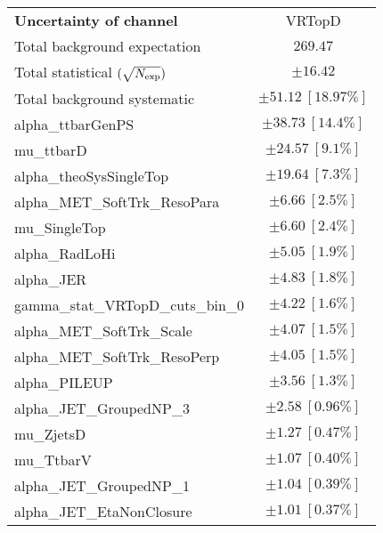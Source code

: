 
\begin{table}
\begin{center}
\setlength{\tabcolsep}{0.0pc}
\begin{tabular*}{\textwidth}{@{\extracolsep{\fill}}lc}
\noalign{\smallskip}\hline\noalign{\smallskip}
{\bf Uncertainty of channel}                                    & VRTopD            \\
\noalign{\smallskip}\hline\noalign{\smallskip}
Total background expectation             &  $269.47$       \\
\noalign{\smallskip}\hline\noalign{\smallskip}
Total statistical $(\sqrt{N_{\rm exp}})$              & $\pm 16.42$       \\
Total background systematic               & $\pm 51.12\ [18.97\%] $             \\
\noalign{\smallskip}\hline\noalign{\smallskip}
\noalign{\smallskip}\hline\noalign{\smallskip}
alpha\_ttbarGenPS         & $\pm 38.73\ [14.4\%] $       \\
mu\_ttbarD         & $\pm 24.57\ [9.1\%] $       \\
alpha\_theoSysSingleTop         & $\pm 19.64\ [7.3\%] $       \\
alpha\_MET\_SoftTrk\_ResoPara         & $\pm 6.66\ [2.5\%] $       \\
mu\_SingleTop         & $\pm 6.60\ [2.4\%] $       \\
alpha\_RadLoHi         & $\pm 5.05\ [1.9\%] $       \\
alpha\_JER         & $\pm 4.83\ [1.8\%] $       \\
gamma\_stat\_VRTopD\_cuts\_bin\_0         & $\pm 4.22\ [1.6\%] $       \\
alpha\_MET\_SoftTrk\_Scale         & $\pm 4.07\ [1.5\%] $       \\
alpha\_MET\_SoftTrk\_ResoPerp         & $\pm 4.05\ [1.5\%] $       \\
alpha\_PILEUP         & $\pm 3.56\ [1.3\%] $       \\
alpha\_JET\_GroupedNP\_3         & $\pm 2.58\ [0.96\%] $       \\
mu\_ZjetsD         & $\pm 1.27\ [0.47\%] $       \\
mu\_TtbarV         & $\pm 1.07\ [0.40\%] $       \\
alpha\_JET\_GroupedNP\_1         & $\pm 1.04\ [0.39\%] $       \\
alpha\_JET\_EtaNonClosure         & $\pm 1.01\ [0.37\%] $       \\

\end{tabular*}
\end{center}
\end{table}
